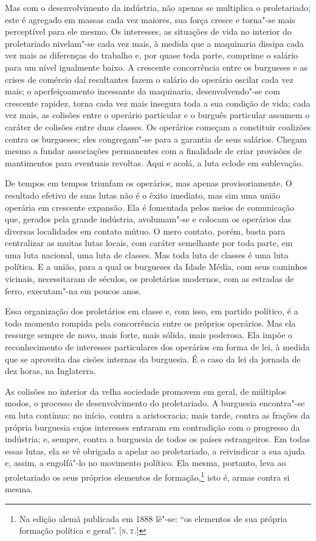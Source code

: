 Mas com o desenvolvimento da indústria, não apenas se multiplica o
proletariado; este é agregado em massas cada vez maiores, sua força
cresce e torna"-se mais perceptível para ele mesmo. Os interesses, as
situações de vida no interior do proletariado nivelam"-se cada vez
mais, à medida que a maquinaria dissipa cada vez mais as diferenças do
trabalho e, por quase toda parte, comprime o salário para um nível
igualmente baixo. A crescente concorrência entre os burgueses e as
crises de comércio daí resultantes fazem o salário do operário oscilar
cada vez mais; o aperfeiçoamento incessante da maquinaria,
desenvolvendo"-se com crescente rapidez, torna cada vez mais insegura
toda a sua condição de vida; cada vez mais, as colisões entre o
operário particular e o burguês particular assumem o caráter de
colisões entre duas classes. Os operários começam a constituir
coalizões contra os burgueses; eles congregam"-se para a garantia de
seus salários. Chegam mesmo a fundar associações permanentes com a
finalidade de criar provisões de mantimentos para eventuais revoltas.
Aqui e acolá, a luta eclode em sublevação.

De tempos em tempos triunfam os operários, mas apenas provisoriamente. O
resultado efetivo de suas lutas não é o êxito imediato, mas sim uma
união operária em crescente expansão. Ela é fomentada pelos meios de
comunicação que, gerados pela grande indústria, avolumam"-se e
colocam os operários das diversas localidades em contato mútuo. O mero
contato, porém, basta para centralizar as muitas lutas locais, com
caráter semelhante por toda parte, em uma luta nacional, uma luta de
classes. Mas toda luta de classes é uma luta política. E a união, para
a qual os burgueses da Idade Média, com seus caminhos vicinais,
necessitaram de séculos, os proletários modernos, com as estradas de
ferro, executam"-na em poucos anos.

Essa organização dos proletários em classe e, com isso, em partido
político, é a todo momento rompida pela concorrência entre os próprios
operários. Mas ela ressurge sempre de novo, mais forte, mais sólida,
mais poderosa. Ela impõe o reconhecimento de interesses particulares
dos operários em forma de lei, à medida que se aproveita das cisões
internas da burguesia. É o caso da lei da jornada de dez horas, na
Inglaterra.

As colisões no interior da velha sociedade promovem em geral, de
múltiplos modos, o processo de desenvolvimento do proletariado. A
burguesia encontra"-se em luta contínua: no início, contra a
aristocracia; mais tarde, contra as frações da própria burguesia cujos
interesses entraram em contradição com o progresso da indústria; e,
sempre, contra a burguesia de todos os países estrangeiros. Em todas
essas lutas, ela se vê obrigada a apelar ao proletariado, a reivindicar
a sua ajuda e, assim, a engolfá"-lo no movimento político. Ela mesma,
portanto, leva ao proletariado os seus próprios elementos de
formação,\footnote{Na edição alemã publicada em 1888 lê"-se: ``os elementos	
de sua própria formação política e geral''. [\textsc{n.\,t.}]} isto é, armas contra 
si mesma.

